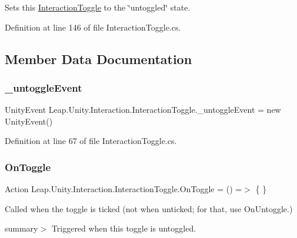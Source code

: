 Sets this \mbox{\hyperlink{class_leap_1_1_unity_1_1_interaction_1_1_interaction_toggle}{Interaction\+Toggle}} to the \char`\"{}untoggled\char`\"{} state. 



Definition at line 146 of file Interaction\+Toggle.\+cs.



\subsection{Member Data Documentation}
\mbox{\label{class_leap_1_1_unity_1_1_interaction_1_1_interaction_toggle_a28d81a96312e39af3871b395e977d088}} 
\subsubsection{\texorpdfstring{\_untoggleEvent}{\_untoggleEvent}}
{\footnotesize\ttfamily Unity\+Event Leap.\+Unity.\+Interaction.\+Interaction\+Toggle.\+\_\+untoggle\+Event = new Unity\+Event()}



Definition at line 67 of file Interaction\+Toggle.\+cs.

\mbox{\label{class_leap_1_1_unity_1_1_interaction_1_1_interaction_toggle_a4d6b89ed3edf03304314adeb0be46130}} 
\subsubsection{\texorpdfstring{OnToggle}{OnToggle}}
{\footnotesize\ttfamily Action Leap.\+Unity.\+Interaction.\+Interaction\+Toggle.\+On\+Toggle = () =$>$ \{ \}}



Called when the toggle is ticked (not when unticked; for that, use On\+Untoggle.) 

summary$>$ Triggered when this toggle is untoggled. 

